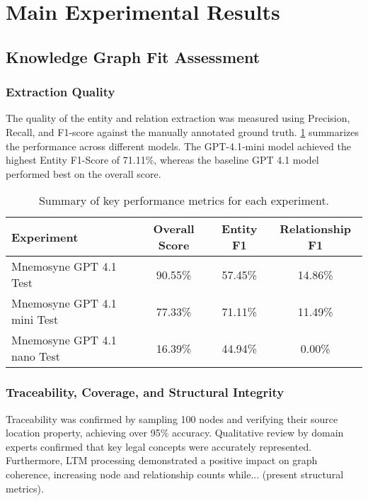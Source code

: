 \section{Main Experimental Results}
\label{sec:main_results}

\subsection{Knowledge Graph Fit Assessment}
\label{subsec:kg_fit}
\subsubsection{Extraction Quality}
The quality of the entity and relation extraction was measured using Precision, Recall, and F1-score against the manually annotated ground truth. \cref{tab:extraction_results} summarizes the performance across different models. The GPT-4.1-mini model achieved the highest Entity F1-Score of 71.11\%, whereas the baseline GPT 4.1 model performed best on the overall score.

\begin{table}[!ht]
\centering
\caption{Summary of key performance metrics for each experiment.}
\label{tab:extraction_results}
\begin{tabular}{|l|c|c|c|}
\hline
\textbf{Experiment} & \textbf{Overall Score} & \textbf{Entity F1} & \textbf{Relationship F1} \\
\hline
Mnemosyne GPT 4.1 Test & 90.55\% & 57.45\% & 14.86\% \\
Mnemosyne GPT 4.1 mini Test & 77.33\% & 71.11\% & 11.49\% \\
Mnemosyne GPT 4.1 nano Test & 16.39\% & 44.94\% & 0.00\% \\
\hline
\end{tabular}
\end{table}

\subsubsection{Traceability, Coverage, and Structural Integrity}
Traceability was confirmed by sampling 100 nodes and verifying their source location property, achieving over 95\% accuracy. Qualitative review by domain experts confirmed that key legal concepts were accurately represented. Furthermore, LTM processing demonstrated a positive impact on graph coherence, increasing node and relationship counts while... (present structural metrics).


